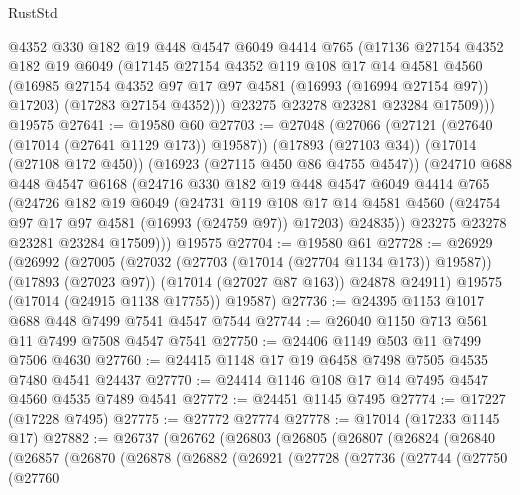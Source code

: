 \begin{lexlean}{RustStd}
\begin{coremodule}
          @4352
          @330
          @182
          @19
          @448
          @4547
          @6049
          @4414
          @765
          (@17136
            @27154
            @4352
            @182
            @19
            @6049
            (@17145
              @27154
              @4352
              @119
              @108
              @17
              @14
              @4581
              @4560
              (@16985 @27154 @4352 @97 @17 @97 @4581 (@16993 (@16994 @27154 @97)) @17203)
              (@17283 @27154 @4352)))
          @23275
          @23278
          @23281
          @23284
          @17509)))
    @19575
@27641 := @19580 @60
@27703 := @27048
    (@27066
      (@27121 (@27640 (@17014 (@27641 @1129 @173)) @19587))
      (@17893 (@27103 @34))
      (@17014 (@27108 @172 @450))
      (@16923 (@27115 @450 @86 @4755 @4547))
      (@24710
        @688
        @448
        @4547
        @6168
        (@24716
          @330
          @182
          @19
          @448
          @4547
          @6049
          @4414
          @765
          (@24726
            @182
            @19
            @6049
            (@24731
              @119
              @108
              @17
              @14
              @4581
              @4560
              (@24754 @97 @17 @97 @4581 (@16993 (@24759 @97)) @17203)
              @24835))
          @23275
          @23278
          @23281
          @23284
          @17509)))
    @19575
@27704 := @19580 @61
@27728 := @26929
    (@26992
      (@27005
        (@27032 (@27703 (@17014 (@27704 @1134 @173)) @19587))
        (@17893 (@27023 @97))
        (@17014 (@27027 @87 @163))
        @24878
        @24911)
      @19575
      (@17014 (@24915 @1138 @17755))
      @19587)
@27736 := @24395 @1153 @1017 @688 @448 @7499 @7541 @4547 @7544
@27744 := @26040 @1150 @713 @561 @11 @7499 @7508 @4547 @7541
@27750 := @24406 @1149 @503 @11 @7499 @7506 @4630
@27760 := @24415 @1148 @17 @19 @6458 @7498 @7505 @4535 @7480 @4541 @24437
@27770 := @24414 @1146 @108 @17 @14 @7495 @4547 @4560 @4535 @7489 @4541
@27772 := @24451 @1145 @7495
@27774 := @17227 (@17228 @7495)
@27775 := @27772 @27774
@27778 := @17014 (@17233 @1145 @17)
@27882 := @26737
    (@26762
      (@26803
        (@26805
          (@26807
            (@26824
              (@26840
                (@26857
                  (@26870
                    (@26878
                      (@26882
                        (@26921
                          (@27728
                            (@27736
                              (@27744
                                (@27750
                                  (@27760

\end{coremodule}
\end{lexlean}
